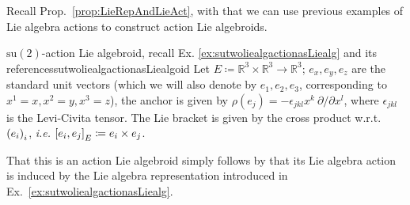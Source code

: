 Recall Prop.~\ref{prop:LieRepAndLieAct}, with that we can use previous examples of Lie algebra actions to construct action Lie algebroids.

\begin{examples}{$\mathrm{su}(2)$-action Lie algebroid, recall Ex. \ref{ex:sutwoliealgactionasLiealg} and its references}{sutwoliealgactionasLiealgoid}
Let $E \coloneqq \mathbb{R}^3 \times \mathbb{R}^3 \to \mathbb{R}^3$; $e_x, e_y, e_z$ are the standard unit vectors (which we will also denote by $e_1, e_2, e_3$, corresponding to $x^1=x, x^2=y, x^3=z$), the anchor is given by $\rho(e_j) = - \epsilon_{jkl} x^k ~ \partial/\partial x^l$, where $\epsilon_{jkl}$ is the Levi-Civita tensor. The Lie bracket is given by the cross product w.r.t. $\mleft(e_i\mright)_i$, \textit{i.e.} $\mleft[ e_i, e_j \mright]_E \coloneqq e_i \times e_j$.
	
That this is an action Lie algebroid simply follows by that its Lie algebra action is induced by the Lie algebra representation introduced in Ex.~\ref{ex:sutwoliealgactionasLiealg}.
\end{examples}

